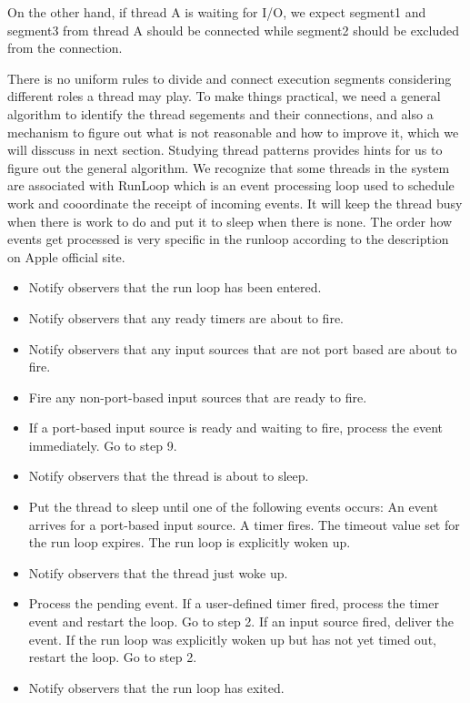 On the other hand, if thread A is waiting for I/O, we expect segment1 and segment3 from thread A should be connected while segment2 should be excluded from the connection.
\par
There is no uniform rules to divide and connect execution segments considering different roles a thread may play.
To make things practical, we need a general algorithm to identify the thread segements and their connections, and also a mechanism to figure out what is not reasonable and how to improve it, which we will disscuss in next section.
Studying thread patterns provides hints for us to figure out the general algorithm.
We recognize that some threads in the system are associated with RunLoop which is an event processing loop used to schedule work and cooordinate the receipt of incoming events.
It will keep the thread busy when there is work to do and put it to sleep when there is none.
The order how events get processed is very specific in the runloop according to the description on Apple official site.
\begin{itemize}
\item Notify observers that the run loop has been entered.
\item Notify observers that any ready timers are about to fire.
\item Notify observers that any input sources that are not port based are about to fire.
\item Fire any non-port-based input sources that are ready to fire.
\item If a port-based input source is ready and waiting to fire, process the event immediately. Go to step 9.
\item Notify observers that the thread is about to sleep.
\item Put the thread to sleep until one of the following events occurs:
\subitem An event arrives for a port-based input source.
\subitem A timer fires.
\subitem The timeout value set for the run loop expires.
\subitem The run loop is explicitly woken up.
\item Notify observers that the thread just woke up.
\item Process the pending event.
\subitem If a user-defined timer fired, process the timer event and restart the loop. Go to step 2.
\subitem If an input source fired, deliver the event.
\subitem If the run loop was explicitly woken up but has not yet timed out, restart the loop. Go to step 2.
\item Notify observers that the run loop has exited.
\end{itemize}

